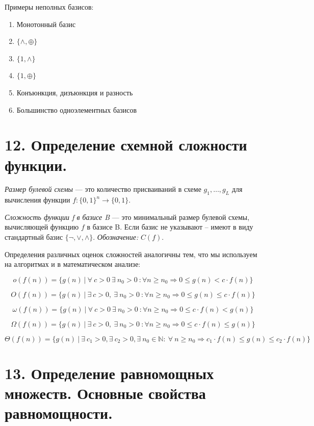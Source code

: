 \documentclass[a4paper, 12pt]{article}
\newcommand{\N}{\mathbb{N}}
\begin{document}
Примеры неполных базисов:

\begin{enumerate}
    \item Монотонный базис
    \item $\{\wedge,\oplus\}$
    \item $\{1,\wedge\}$
    \item $\{1,\oplus\}$
    \item Конъюнкция, дизъюнкция и разность
    \item Большинство одноэлементных базисов
\end{enumerate}

\section*{12. Определение схемной сложности функции.}

\textit{Размер булевой схемы} --- это количество присваиваний в схеме 
$g_1, \ldots, g_L$ для вычисления функции $f: \{0, 1\}^n \rightarrow \{0, 1\}$. 

\textit{Сложность функции f в базисе B} --- это минимальный размер булевой схемы, 
вычисляющей функцию $f$ в базисе B. Если базис не указывают -- имеют в виду 
стандартный базис $\{\lnot, \lor, \land\}$. \textit{Обозначение:} $C(f)$.

Определения различных оценок сложностей аналогичны тем, что мы используем на алгоритмах и в математическом анализе:

    \[
        o(f(n)) = \{g(n) \ | \ \forall \ c > 0 \ \exists \ n_0 > 0 \ : \forall n \geq n_0 \Rightarrow 0 \leq g(n) < c \cdot f(n)\}
    \]

    \[
        O(f(n)) = \{g(n) \ | \ \exists \ c > 0, \ \exists \ n_0 > 0 \ : \forall n \geq n_0 \Rightarrow 0 \leq g(n) \leq c \cdot f(n)\}
    \]

    \[
        \omega(f(n)) = \{g(n) \ | \ \forall \ c > 0 \ \exists \ n_0 > 0 \ : \forall n \geq n_0 \Rightarrow 0 \leq c \cdot f(n) < g(n)\}
    \]

    \[
        \Omega(f(n)) = \{g(n) \ | \ \exists \ c > 0, \ \exists \ n_0 > 0 \ : \forall n \geq n_0 \Rightarrow 0 \leq c \cdot f(n) \leq g(n)\}
    \]

    \[
        \Theta(f(n)) = \{g(n) \ | \ \exists \ c_1 > 0, \exists \ c_2 > 0, \exists \ n_0 \in \N: \ \forall \ n \geq n_0 \Rightarrow c_1 \cdot f(n) \leq g(n) \leq c_2 \cdot f(n)\}
    \]

\section*{13. Определение равномощных множеств. Основные свойства равномощности.}
\end{document}
